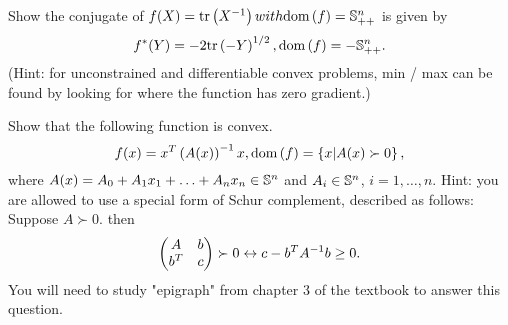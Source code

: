 \documentclass{exam}
\begin{document}
\begin{questions}



    \question Show the conjugate of $f(X) = \tr{X^\inv} with \dom{f} = \S_{++}^n$ is given by
    $$f^*(Y) = -2\tr{-Y}^{1 / 2}, \dom{f} = -\S_{++}^n.$$
    (Hint: for unconstrained and differentiable convex problems, min / max can be found by looking for where the function
    has zero gradient.)

    \question Show that the following function is convex.
    $$f(x) = x^T\paren{A(x)}^\inv x, \dom{f} = \cbrac{x | A(x) \succ 0},$$
    where $A(x) = A_0 + A_1x_1 + \hdots + A_nx_n \in\S^n$ and $A_i\in\S^n$, $i = 1, \hdots, n$. Hint: you are allowed to use
    a special form of Schur complement, described as follows: Suppose $A \succ 0$. then
    $$\paren{\begin{matrix}
        A & b \\
        b^T & c
    \end{matrix}} \succ 0 \leftrightarrow c - b^TA^\inv b \geq 0.$$
    You will need to study "epigraph" from chapter 3 of the textbook to answer this question.


\end{questions}
\end{document}
